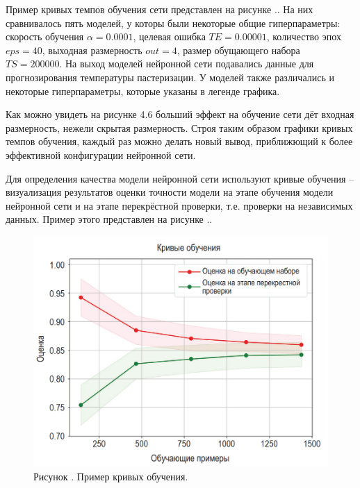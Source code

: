 {  \par \redline Пример кривых темпов обучения сети представлен на рисунке \thechaptercntr .\theimagecntr. На них сравнивалось пять моделей, у которы были некоторые общие гиперпараметры: скорость обучения $\alpha = 0.0001$, целевая ошибка $TE = 0.00001$, количество эпох $eps = 40$, выходная размерность $out = 4$, размер обущающего набора $TS = 200000$. На выход моделей нейронной сети подавались данные для прогнозирования температуры пастеризации. У моделей также различались и некоторые гиперпараметры, которые указаны в легенде графика.

  \par \redline Как можно увидеть на рисунке 4.6 больший эффект на обучение сети дёт входная размерность, нежели скрытая размерность. Строя таким образом графики кривых темпов обучения, каждый раз можно делать новый вывод, приближющий к более эффективной конфигурации нейронной сети. 

  \par \redline Для определения качества модели нейронной сети используют кривые обучения {--} визуализация результатов оценки точности модели на этапе обучения модели нейронной сети и на этапе перекрёстной проверки, т.е. проверки на независимых данных. Пример этого представлен на рисунке \thechaptercntr .\theimagecntr.

  \begin{figure}[H]
    \centering
    \def\svgwidth{\textwidth}
    \includegraphics[scale=0.5]{images/CL.png}
    \caption*{\gostFont Рисунок \thechaptercntr .\theimagecntr \spc {--} Пример кривых обучения.}
    \label{fig:CL}
  \end{figure} \addtocounter{imagecntr}{1}

}
